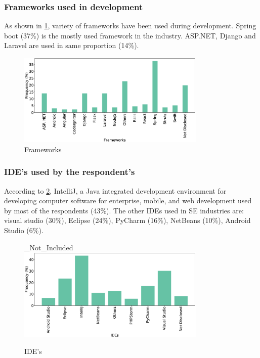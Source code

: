 \subsubsection{Frameworks used in development}
As shown in \ref{fig:frameworks}, variety of frameworks have been used during development. Spring boot (37\%) is the mostly used framework in the industry. ASP.NET, Django and Laravel are used in same proportion (14\%).

\begin{figure}[htbp]
\centering
  \includegraphics[width=0.8\textwidth]{Figures/Respondents_frameworks}
  \caption{Frameworks}
  \label{fig:frameworks}
\end{figure}

\subsubsection{IDE's used by the respondent's}
According to \ref{fig:IDEs}, IntelliJ, a Java integrated development environment for developing computer software for enterprise, mobile, and web development used by most of the respondents (43\%). The other IDEs used in SE industries are: visual studio (30\%), Eclipse (24\%), PyCharm (16\%), NetBeans (10\%), Android Studio (6\%).

\begin{figure}[htbp]
\centering
_Not_Included  \includegraphics[width=0.8\textwidth]{Figures/Respondents_IDEs}
  \caption{IDE's}
  \label{fig:IDEs}
\end{figure}
